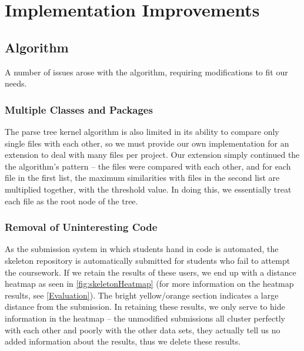 \chapter{Implementation Improvements}

\section{Algorithm}

A number of issues arose with the algorithm, requiring modifications to fit our
needs. 

\subsection{Multiple Classes and Packages}

The parse tree kernel algorithm is also limited in its ability to compare only
single files with each other, so we must provide our own implementation for
an extension to deal with many files per project. Our extension simply continued
the the algorithm's pattern -- the files were compared with each other, and for
each file in the first list, the maximum similarities with files in the second
list are multiplied together, with the threshold value. In doing this, we essentially
treat each file as the root node of the tree.

\subsection{Removal of Uninteresting Code}

As the submission system in which students hand in code is automated, the 
skeleton repository is automatically submitted for students who fail to attempt
the coursework. If we retain the results of these users, we end up with a
distance heatmap as seen in \cref{fig:skeletonHeatmap} (for more information on
the heatmap results, see \cref{Evaluation}). The bright yellow/orange section indicates
a large distance from the submission. In retaining these results, we only serve to
hide information in the heatmap -- the unmodified submissions all cluster perfectly
with each other and poorly with the other data sets, they actually tell us no added
information about the results, thus we delete these results.

